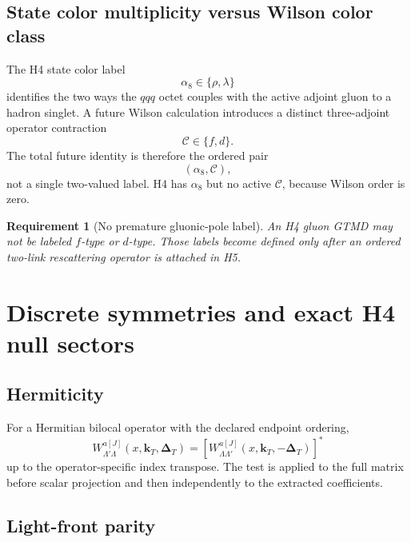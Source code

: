 \documentclass[11pt]{article}
\newtheorem{requirement}[definition]{Requirement}
\newcommand{\kT}{\bm{k}_{T}}
\newcommand{\DT}{\bm{\Delta}_{T}}
\newcommand{\cC}{\mathcal C}
\begin{document}
\subsection{State color multiplicity versus Wilson color class}

The H4 state color label
\begin{equation}
 \alpha_{8}\in\{\rho,\lambda\}
\end{equation}
identifies the two ways the \(qqq\) octet couples with the active adjoint gluon
to a hadron singlet.  A future Wilson calculation introduces a distinct
three-adjoint operator contraction
\begin{equation}
 \cC\in\{f,d\}.
\end{equation}
The total future identity is therefore the ordered pair
\begin{equation}
 (\alpha_8,\cC),
 \label{eq:color-two-layer-id}
\end{equation}
not a single two-valued label.  H4 has \(\alpha_8\) but no active \(\cC\),
because Wilson order is zero.

\begin{requirement}[No premature gluonic-pole label]
\label{req:no-premature-fd}
An H4 gluon GTMD may not be labeled \(f\)-type or \(d\)-type.  Those labels
become defined only after an ordered two-link rescattering operator is attached
in H5.
\end{requirement}

\section{Discrete symmetries and exact H4 null sectors}
\label{sec:discrete-symmetry}

\subsection{Hermiticity}

For a Hermitian bilocal operator with the declared endpoint ordering,
\begin{equation}
 W_{\Lambda'\Lambda}^{a[J]}
 (x,\kT,\DT)
 =
 \left[
 W_{\Lambda\Lambda'}^{a[J]}
 (x,\kT,-\DT)
 \right]^*
 \label{eq:h4-hermiticity}
\end{equation}
up to the operator-specific index transpose.  The test is applied to the full
matrix before scalar projection and then independently to the extracted
coefficients.

\subsection{Light-front parity}
\end{document}
